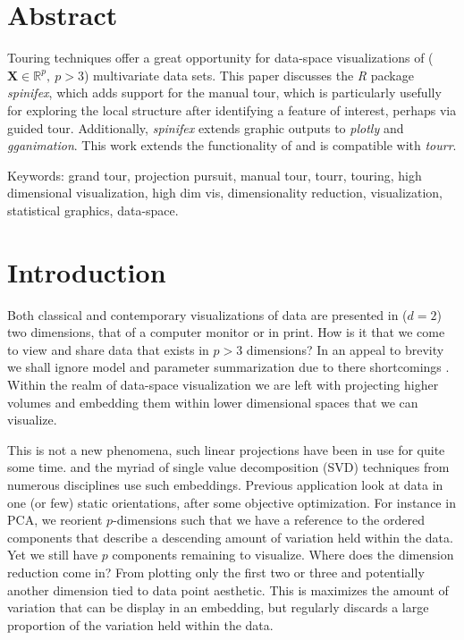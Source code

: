 \documentclass{monashthesis}
\begin{document}
\section{Abstract}\label{abstract-1}

Touring techniques offer a great opportunity for data-space
visualizations of (\(\textbf{X} \in \mathbb{R}^p,~p > 3\)) multivariate
data sets. This paper discusses the \emph{R} package \emph{spinifex},
which adds support for the manual tour, which is particularly usefully
for exploring the local structure after identifying a feature of
interest, perhaps via guided tour. Additionally, \emph{spinifex} extends
graphic outputs to \emph{plotly} and \emph{gganimation}. This work
extends the functionality of and is compatible with \emph{tourr}.

Keywords: grand tour, projection pursuit, manual tour, tourr, touring,
high dimensional visualization, high dim vis, dimensionality reduction,
visualization, statistical graphics, data-space.

\section{Introduction}\label{introduction}

Both classical and contemporary visualizations of data are presented in
(\(d=2\)) two dimensions, that of a computer monitor or in print. How is
it that we come to view and share data that exists in \(p > 3\)
dimensions? In an appeal to brevity we shall ignore model and parameter
summarization due to there shortcomings
\autocites{anscombe_graphs_1973}{matejka_same_2017}. Within the realm of
data-space visualization we are left with projecting higher volumes and
embedding them within lower dimensional spaces that we can visualize.

This is not a new phenomena, such linear projections have been in use
for quite some time. \autocites{pearson_liii._1901}{fisher_use_1936} and
the myriad of single value decomposition (SVD) techniques from numerous
disciplines use such embeddings. Previous application look at data in
one (or few) static orientations, after some objective optimization. For
instance in PCA, we reorient \(p\)-dimensions such that we have a
reference to the ordered components that describe a descending amount of
variation held within the data. Yet we still have \(p\) components
remaining to visualize. Where does the dimension reduction come in? From
plotting only the first two or three and potentially another dimension
tied to data point aesthetic. This is maximizes the amount of variation
that can be display in an embedding, but regularly discards a large
proportion of the variation held within the data.
\end{document}
